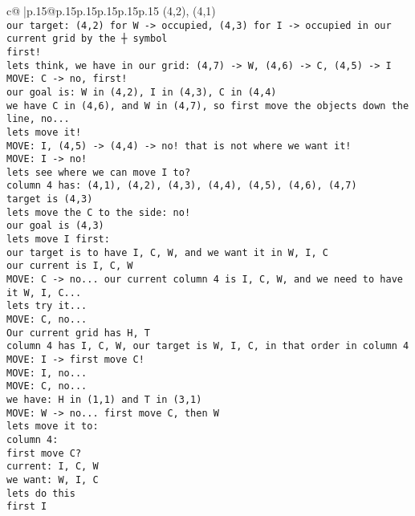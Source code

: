 \documentclass{article}
\begin{document}
{\begin{supertabular}{c@{$\;$}|p{.15\linewidth}@{}p{.15\linewidth}p{.15\linewidth}p{.15\linewidth}p{.15\linewidth}p{.15\linewidth}}
{{{(4,2), (4,1) \\ \tt  our target: (4,2) for W -> occupied, (4,3) for I -> occupied in our current grid by the ┼ symbol\\ \tt  first!\\ \tt  lets think, we have in our grid: (4,7) -> W, (4,6) -> C, (4,5) -> I \\ \tt  MOVE: C -> no, first!\\ \tt  our goal is: W in (4,2), I in (4,3), C in (4,4)\\ \tt  we have C in (4,6), and W in (4,7), so first move the objects down the line, no...\\ \tt  lets move it!\\ \tt  MOVE: I, (4,5) -> (4,4) -> no! that is not where we want it!\\ \tt  MOVE: I -> no! \\ \tt lets see where we can move I to? \\ \tt  column 4 has: (4,1), (4,2), (4,3), (4,4), (4,5), (4,6), (4,7) \\ \tt  target is (4,3) \\ \tt  lets move the C to the side: no!\\ \tt  our goal is (4,3) \\ \tt  lets move I first: \\ \tt   our target is to have I, C, W, and we want it in W, I, C \\ \tt  our current is I, C, W\\ \tt  MOVE: C -> no... our current column 4 is I, C, W, and we need to have it W, I, C...\\ \tt  lets try it...\\ \tt  MOVE: C, no... \\ \tt   Our current grid has H, T \\ \tt  column 4 has I, C, W, our target is W, I, C, in that order in column 4 \\ \tt  MOVE: I -> first move C!\\ \tt  MOVE: I, no...\\ \tt  MOVE: C, no...\\ \tt  we have: H in (1,1) and T in (3,1) \\ \tt  MOVE: W -> no... first move C, then W\\ \tt  lets move it to: \\ \tt  column 4: \\ \tt  first move C?\\ \tt  current: I, C, W \\ \tt  we want: W, I, C \\ \tt  lets do this \\ \tt  first I }}}
\end{supertabular}}
\end{document}
